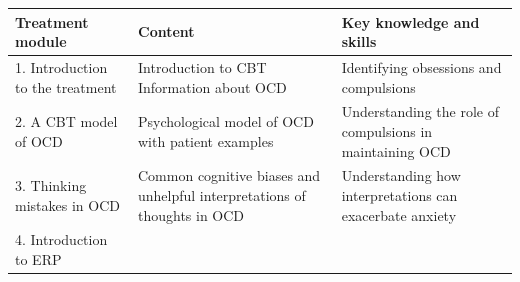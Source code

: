 \documentclass[]{book}
\theoremstyle{definition}
\theoremstyle{definition}
\theoremstyle{definition}
\theoremstyle{remark}
\begin{document}
\begin{longtable}[]{@{}lll@{}}
\toprule
\begin{minipage}[b]{0.30\columnwidth}\raggedright
\textbf{Treatment module}\strut
\end{minipage} & \begin{minipage}[b]{0.30\columnwidth}\raggedright
\textbf{Content}\strut
\end{minipage} & \begin{minipage}[b]{0.30\columnwidth}\raggedright
\textbf{Key knowledge and skills}\strut
\end{minipage}\tabularnewline
\midrule
\endhead
\begin{minipage}[t]{0.30\columnwidth}\raggedright
1. Introduction to the treatment\strut
\end{minipage} & \begin{minipage}[t]{0.30\columnwidth}\raggedright
Introduction to CBT Information about OCD\strut
\end{minipage} & \begin{minipage}[t]{0.30\columnwidth}\raggedright
Identifying obsessions and compulsions\strut
\end{minipage}\tabularnewline
\begin{minipage}[t]{0.30\columnwidth}\raggedright
2. A CBT model of OCD\strut
\end{minipage} & \begin{minipage}[t]{0.30\columnwidth}\raggedright
Psychological model of OCD with patient examples\strut
\end{minipage} & \begin{minipage}[t]{0.30\columnwidth}\raggedright
Understanding the role of compulsions in maintaining OCD\strut
\end{minipage}\tabularnewline
\begin{minipage}[t]{0.30\columnwidth}\raggedright
3. Thinking mistakes in OCD\strut
\end{minipage} & \begin{minipage}[t]{0.30\columnwidth}\raggedright
Common cognitive biases and unhelpful interpretations of thoughts in
OCD\strut
\end{minipage} & \begin{minipage}[t]{0.30\columnwidth}\raggedright
Understanding how interpretations can exacerbate anxiety\strut
\end{minipage}\tabularnewline
\begin{minipage}[t]{0.30\columnwidth}\raggedright
4. Introduction to ERP\strut
\end{minipage} & \begin{minipage}[t]{0.30\columnwidth}\raggedright

\end{minipage}
\end{longtable}
\end{document}
